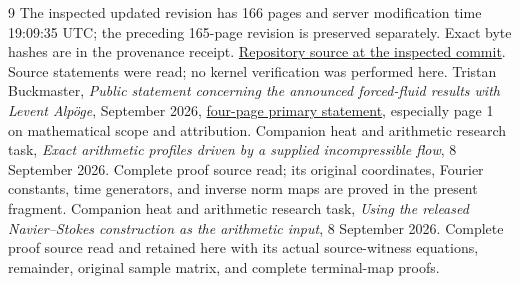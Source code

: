 \begin{thebibliography}{9}
The inspected updated revision has 166 pages and server modification
time 19:09:35 UTC; the preceding 165-page revision is preserved
separately. Exact byte hashes are in the provenance receipt.
\href{https://github.com/openai/NavierStokesAndEuler/tree/8937a8f4cbc7abaab5e9e97d1cc7f5d2319d9538}{Repository source at the inspected commit}.
Source statements were read; no kernel verification was performed here.
Tristan Buckmaster, \emph{Public statement concerning the announced
forced-fluid results with Levent Alp\"oge}, September 2026,
\href{https://cims.nyu.edu/~tristanb/statement.pdf}{four-page primary statement},
especially page 1 on mathematical scope and attribution.
Companion heat and arithmetic research task,
\emph{Exact arithmetic profiles driven by a supplied incompressible flow},
8 September 2026. Complete proof source read; its original coordinates,
Fourier constants, time generators, and inverse norm maps are
proved in the present fragment.
Companion heat and arithmetic research task,
\emph{Using the released Navier--Stokes construction as the arithmetic input},
8 September 2026. Complete proof source read and retained here with
its actual source-witness equations, remainder, original sample
matrix, and complete terminal-map proofs.
\end{thebibliography}
